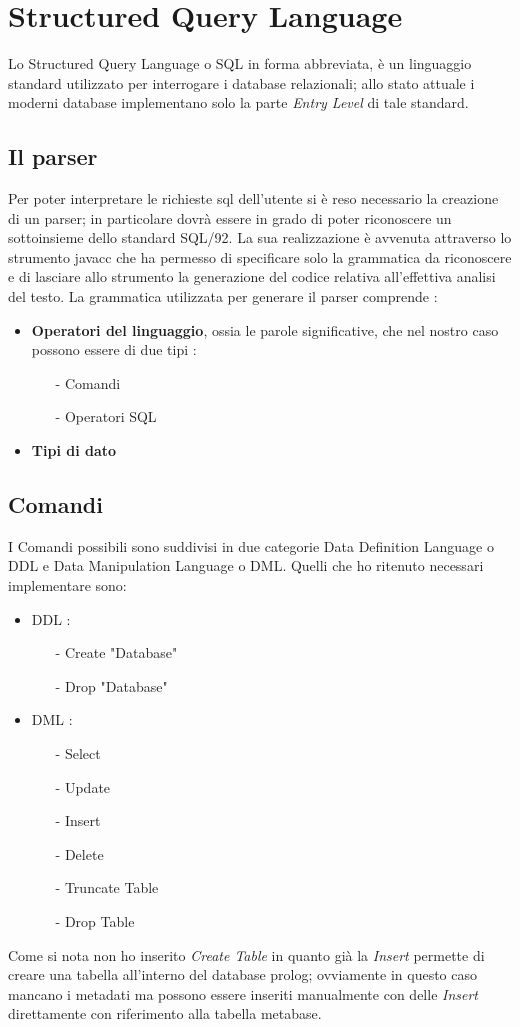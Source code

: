 \section{Structured Query Language}

Lo Structured Query Language o SQL in forma abbreviata, è un linguaggio standard utilizzato per interrogare i database relazionali; allo stato attuale i moderni database implementano solo la parte \emph{Entry Level} di tale standard. 

\subsection{Il parser}
Per poter interpretare le richieste sql dell'utente si è reso necessario la creazione di un parser; in particolare dovrà essere in grado di poter riconoscere un sottoinsieme dello standard SQL/92. La sua realizzazione è avvenuta attraverso lo strumento javacc che ha permesso di specificare solo la grammatica da riconoscere e di lasciare allo strumento la generazione del codice relativa all'effettiva analisi del testo. La grammatica utilizzata per generare il parser comprende :
\begin{itemize}
\item {\bf Operatori del linguaggio}, ossia le parole significative, che nel nostro caso possono essere di due tipi : 
\begin{itemize}
\item[-] Comandi
\item[-] Operatori SQL
\end{itemize}
\item {\bf Tipi di dato}
\end{itemize}

\subsection{Comandi}
I Comandi possibili sono suddivisi in due categorie Data Definition Language o DDL e Data Manipulation Language o DML. Quelli che ho ritenuto necessari implementare sono:
\begin{itemize}
\item DDL :
\begin{itemize}
\item[-] Create "Database"
\item[-] Drop "Database"
\end{itemize}
\item DML :
\begin{itemize}
\item[-] Select
\item[-] Update
\item[-] Insert 
\item[-] Delete
\item[-] Truncate Table
\item[-] Drop Table
\end{itemize}
\end{itemize}
Come si nota non ho inserito \emph{Create Table} in quanto già la \emph{Insert} permette di creare una tabella all'interno del database prolog; ovviamente in questo caso mancano i metadati ma possono essere inseriti manualmente con delle \emph{Insert} direttamente con riferimento alla tabella metabase. 

